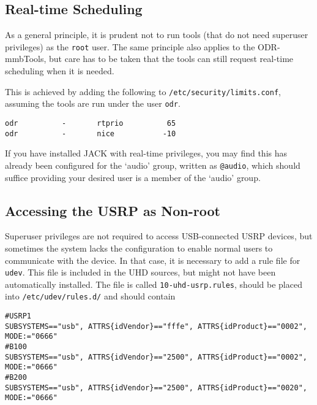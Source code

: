 \subsection{Real-time Scheduling}

As a general principle, it is prudent not to run tools (that do not need superuser
privileges) as the \texttt{root} user. The same principle also applies to the
ODR-mmbTools, but care has to be taken that the tools can still request real-time
scheduling when it is needed.

This is achieved by adding the following to \texttt{/etc/security/limits.conf},
assuming the tools are run under the user \texttt{odr}.

\begin{lstlisting}
odr          -       rtprio          65
odr          -       nice           -10
\end{lstlisting}

If you have installed JACK with real-time privileges, you may find this has
already been configured for the `audio' group, written as \texttt{@audio}, which
should suffice providing your desired user is a member of the `audio' group.

\subsection{Accessing the USRP as Non-root}

Superuser privileges are not required to access USB-connected USRP devices, but
sometimes the system lacks the configuration to enable normal users to
communicate with the device.
In that case, it is necessary to add a rule file for \texttt{udev}. This file is
included in the UHD sources, but might not have been automatically installed.
The file is called \texttt{10-uhd-usrp.rules}, should be placed into
\texttt{/etc/udev/rules.d/} and should contain

{ \footnotesize
\begin{verbatim}
#USRP1
SUBSYSTEMS=="usb", ATTRS{idVendor}=="fffe", ATTRS{idProduct}=="0002", MODE:="0666"
#B100
SUBSYSTEMS=="usb", ATTRS{idVendor}=="2500", ATTRS{idProduct}=="0002", MODE:="0666"
#B200
SUBSYSTEMS=="usb", ATTRS{idVendor}=="2500", ATTRS{idProduct}=="0020", MODE:="0666"
\end{verbatim}
}

